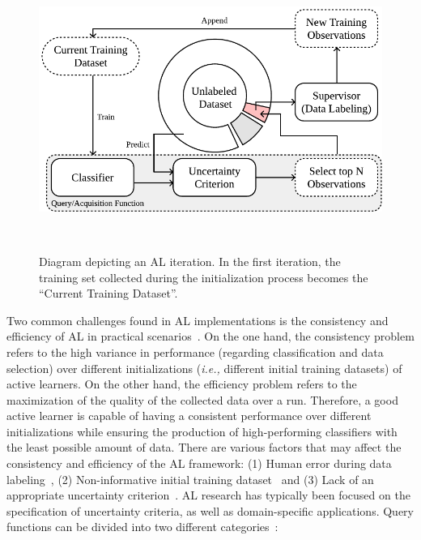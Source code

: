 \begin{figure}[ht]
	\centering
	\includegraphics[width=.6\linewidth]{al_iteration}
    \caption[Diagram depicting an AL iteration.]{%
        Diagram depicting an AL iteration. In the first iteration, the
        training set collected during the initialization process becomes the
        ``Current Training Dataset''.
    }~\label{fig:al_iteration_int}
\end{figure}

Two common challenges found in AL implementations is the consistency and
efficiency of AL in practical scenarios~\cite{Kottke2017}. On the one hand,
the consistency problem refers to the high variance in performance (regarding
classification and data selection) over different initializations
(\textit{i.e.,} different initial training datasets) of active learners. On
the other hand, the efficiency problem refers to the maximization of the
quality of the collected data over a run. Therefore, a good active learner is
capable of having a consistent performance over different initializations
while ensuring the production of high-performing classifiers with the least
possible amount of data. There are various factors that may affect the
consistency and efficiency of the AL framework: (1) Human error during data
labeling~\cite{li2020}, (2) Non-informative initial training
dataset~\cite{Nguyen2004} and (3) Lack of an appropriate uncertainty
criterion~\cite{Rosario2020}. AL research has typically been focused on the
specification of uncertainty criteria, as well as domain-specific
applications. Query functions can be divided into two different
categories~\cite{Gu2021, Kumar2020}: 


